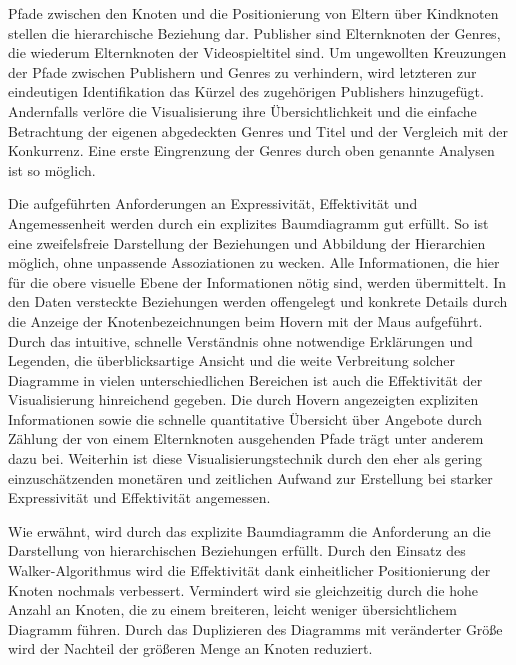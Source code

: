 \documentclass[usegeometry=true]{scrartcl}
\begin{document}
Pfade zwischen den Knoten und die Positionierung von Eltern über Kindknoten stellen die hierarchische Beziehung dar. 
Publisher sind Elternknoten der Genres, die wiederum Elternknoten der Videospieltitel sind.
Um ungewollten Kreuzungen der Pfade zwischen Publishern und Genres zu verhindern, wird letzteren zur eindeutigen Identifikation das Kürzel des zugehörigen Publishers hinzugefügt.
Andernfalls verlöre die Visualisierung ihre Übersichtlichkeit und die einfache Betrachtung der eigenen abgedeckten Genres und Titel und der Vergleich mit der Konkurrenz.
Eine erste Eingrenzung der Genres durch oben genannte Analysen ist so möglich.

Die aufgeführten Anforderungen an Expressivität, Effektivität und Angemessenheit werden durch ein explizites Baumdiagramm gut erfüllt.
So ist eine zweifelsfreie Darstellung der Beziehungen und Abbildung der Hierarchien möglich, ohne unpassende Assoziationen zu wecken. 
Alle Informationen, die hier für die obere visuelle Ebene der Informationen nötig sind, werden übermittelt. 
In den Daten versteckte Beziehungen werden offengelegt und konkrete Details durch die Anzeige der Knotenbezeichnungen beim Hovern mit der Maus aufgeführt.
Durch das intuitive, schnelle Verständnis ohne notwendige Erklärungen und Legenden, die überblicksartige Ansicht und die weite Verbreitung solcher Diagramme in vielen unterschiedlichen Bereichen ist auch die Effektivität der Visualisierung hinreichend gegeben. 
Die durch Hovern angezeigten expliziten Informationen sowie die schnelle quantitative Übersicht über Angebote durch Zählung der von einem Elternknoten ausgehenden Pfade trägt unter anderem dazu bei.
Weiterhin ist diese Visualisierungstechnik durch den eher als gering einzuschätzenden monetären und zeitlichen Aufwand zur Erstellung bei starker Expressivität und Effektivität angemessen.

Wie erwähnt, wird durch das explizite Baumdiagramm die Anforderung an die Darstellung von hierarchischen Beziehungen erfüllt.
Durch den Einsatz des Walker-Algorithmus wird die Effektivität dank einheitlicher Positionierung der Knoten nochmals verbessert.\cite[688ff.]{Walker.1990}
Vermindert wird sie gleichzeitig durch die hohe Anzahl an Knoten, die zu einem breiteren, leicht weniger übersichtlichem Diagramm führen. 
Durch das Duplizieren des Diagramms mit veränderter Größe wird der Nachteil der größeren Menge an Knoten reduziert.
\end{document}
